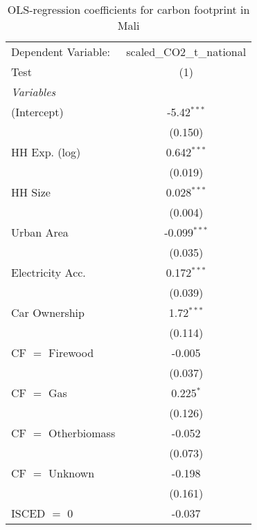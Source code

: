 
\begin{table}[htbp!]
   \centering
   \small
   \begin{adjustbox}{width = 1\textwidth, max height = 0.95\textheight, center}
      \begin{threeparttable}[b]
         \caption{\label{tab:OLS_2_MLI} OLS-regression coefficients for carbon footprint in Mali}
         \begin{tabular}{lc}
            \tabularnewline \midrule \midrule
            Dependent Variable: & scaled\_CO2\_t\_national\\     
            Test                & (1)\\  
            \midrule
            \emph{Variables}\\
            (Intercept)         & -5.42$^{***}$\\   
                                & (0.150)\\   
            HH Exp. (log)       & 0.642$^{***}$\\   
                                & (0.019)\\   
            HH Size             & 0.028$^{***}$\\   
                                & (0.004)\\   
            Urban Area          & -0.099$^{***}$\\   
                                & (0.035)\\   
            Electricity Acc.    & 0.172$^{***}$\\   
                                & (0.039)\\   
            Car Ownership       & 1.72$^{***}$\\   
                                & (0.114)\\   
            CF $=$ Firewood     & -0.005\\   
                                & (0.037)\\   
            CF $=$ Gas          & 0.225$^{*}$\\   
                                & (0.126)\\   
            CF $=$ Otherbiomass & -0.052\\   
                                & (0.073)\\   
            CF $=$ Unknown      & -0.198\\   
                                & (0.161)\\   
            ISCED $=$ 0         & -0.037\\   

\end{tabular}
\end{threeparttable}
\end{adjustbox}
\end{table}
